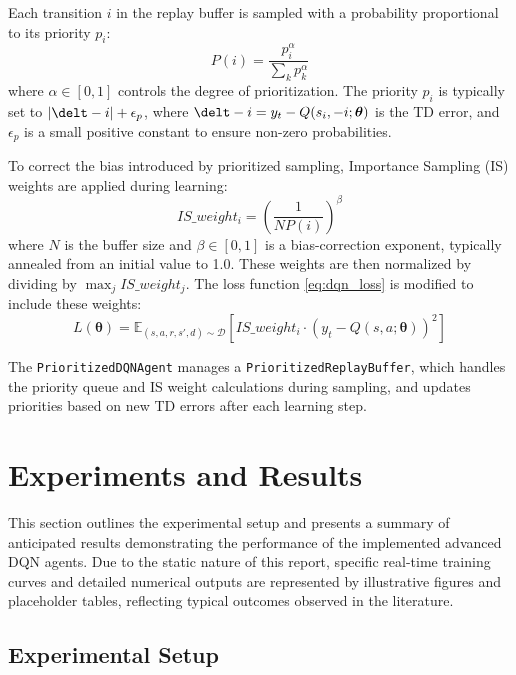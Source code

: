 \documentclass[conference]{IEEEtran}
\newcommand{\thetab}{\boldsymbol{\theta}}
\begin{document}
Each transition \(i\) in the replay buffer is sampled with a probability proportional to its priority \(p_i\):
\begin{equation}
P(i) = \frac{p_i^\alpha}{\sum_k p_k^\alpha}
\label{eq:per_prob}
\end{equation}
where \(\alpha \in [0, 1]\) controls the degree of prioritization. The priority \(p_i\) is typically set to \(|\delt-i| + \epsilon_{p}\), where \(\delt-i = y_t - Q(s_i, -i; \thetab)\) is the TD error, and \(\epsilon_{p}\) is a small positive constant to ensure non-zero probabilities.

To correct the bias introduced by prioritized sampling, Importance Sampling (IS) weights are applied during learning:
\begin{equation}
IS\_weight_i = \left( \frac{1}{N P(i)} \right)^\beta
\label{eq:is_weights}
\end{equation}
where \(N\) is the buffer size and \(\beta \in [0, 1]\) is a bias-correction exponent, typically annealed from an initial value to 1.0. These weights are then normalized by dividing by \(\max_j IS\_weight_j\). The loss function \eqref{eq:dqn_loss} is modified to include these weights:
\begin{equation}
L(\thetab) = \mathbb{E}_{(s,a,r,s',d) \sim \mathcal{D}} \left[ IS\_weight_i \cdot \left( y_t - Q(s, a; \thetab) \right)^2 \right]
\label{eq:per_loss}
\end{equation}

The \texttt{PrioritizedDQNAgent} manages a \texttt{PrioritizedReplayBuffer}, which handles the priority queue and IS weight calculations during sampling, and updates priorities based on new TD errors after each learning step.

\section{Experiments and Results}
This section outlines the experimental setup and presents a summary of anticipated results demonstrating the performance of the implemented advanced DQN agents. Due to the static nature of this report, specific real-time training curves and detailed numerical outputs are represented by illustrative figures and placeholder tables, reflecting typical outcomes observed in the literature.

\subsection{Experimental Setup}
\end{document}
